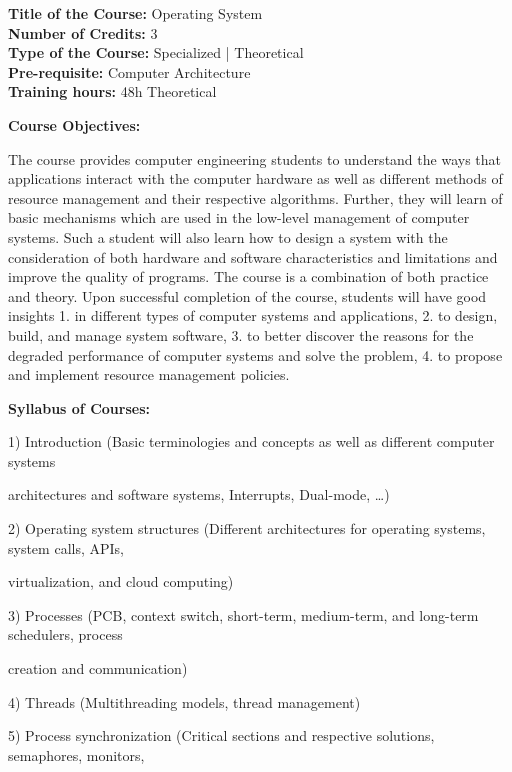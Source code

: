 \documentclass[12pt,a4paper]{article}
\begin{document}
\newpage
\textbf{Title of the Course:} Operating System\\
\textbf{Number of Credits:} 3\\
\textbf{Type of the Course:} Specialized | Theoretical\\
\textbf{Pre-requisite:} Computer Architecture\\
\textbf{Training hours:} 48h Theoretical\par\vspace{4pt}
\textbf{Course Objectives:}\par\vspace{2pt}
The course provides computer engineering students to understand the ways that applications
interact with the computer hardware as well as different methods of resource management and
their respective algorithms. Further, they will learn of basic mechanisms which are used in the
low-level management of computer systems. Such a student will also learn how to design a system
with the consideration of both hardware and software characteristics and limitations and improve
the quality of programs. The course is a combination of both practice and theory.
Upon successful completion of the course, students will have good insights
1. in different types of computer systems and applications,
2. to design, build, and manage system software,
3. to better discover the reasons for the degraded performance of computer systems and solve the
problem,
4. to propose and implement resource management policies.\par\vspace{4pt}
\textbf{Syllabus of Courses:}\par\vspace{2pt}
1) Introduction (Basic terminologies and concepts as well as different computer systems\par
architectures and software systems, Interrupts, Dual-mode, …)\par
2) Operating system structures (Different architectures for operating systems, system calls, APIs,\par
virtualization, and cloud computing)\par
3) Processes (PCB, context switch, short-term, medium-term, and long-term schedulers, process\par
creation and communication)\par
4) Threads (Multithreading models, thread management)\par
5) Process synchronization (Critical sections and respective solutions, semaphores, monitors,\par
\end{document}
